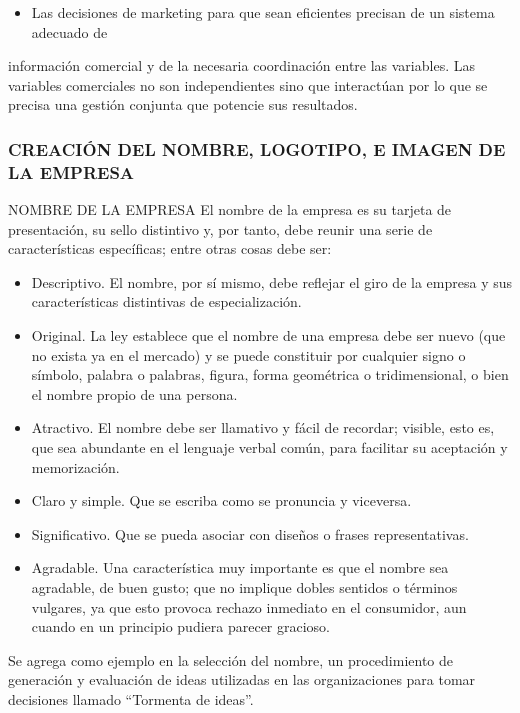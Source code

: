 \begin{itemize}
  \item Las decisiones de marketing para que sean eficientes precisan de un sistema adecuado de
\end{itemize}
información comercial y de la necesaria coordinación entre las variables. Las variables comerciales no son independientes sino que interactúan por lo que se precisa una gestión conjunta que potencie sus resultados.

\subsubsection*{CREACIÓN DEL NOMBRE, LOGOTIPO, E IMAGEN DE LA EMPRESA}
NOMBRE DE LA EMPRESA El nombre de la empresa es su tarjeta de presentación, su sello distintivo y, por tanto, debe reunir una serie de características específicas; entre otras cosas debe ser:



\begin{itemize}
  \item Descriptivo. El nombre, por sí mismo, debe reflejar el giro de la empresa y sus características distintivas de especialización.
  \item Original. La ley establece que el nombre de una empresa debe ser nuevo (que no exista ya en el mercado) y se puede constituir por cualquier signo o símbolo, palabra o palabras, figura, forma geométrica o tridimensional, o bien el nombre propio de una persona.
  \item Atractivo. El nombre debe ser llamativo y fácil de recordar; visible, esto es, que sea abundante en el lenguaje verbal común, para facilitar su aceptación y memorización.
  \item Claro y simple. Que se escriba como se pronuncia y viceversa.
  \item Significativo. Que se pueda asociar con diseños o frases representativas.
  \item Agradable. Una característica muy importante es que el nombre sea agradable, de buen gusto; que no implique dobles sentidos o términos vulgares, ya que esto provoca rechazo inmediato en el consumidor, aun cuando en un principio pudiera parecer gracioso.
\end{itemize}
Se agrega como ejemplo en la selección del nombre, un procedimiento de generación y evaluación de ideas utilizadas en las organizaciones para tomar decisiones llamado “Tormenta de ideas”.


